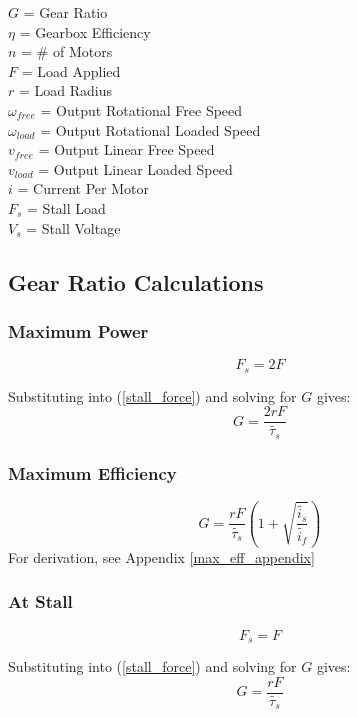 \documentclass[11pt,a4paper,titlepage]{article}
\begin{document}
	$G$ = Gear Ratio \\
	$\eta$ = Gearbox Efficiency \\
	$n$ = \# of Motors \\
	$F$ = Load Applied \\
	$r$ = Load Radius \\
	$\omega_{free}$ = Output Rotational Free Speed \\
	$\omega_{load}$ = Output Rotational Loaded Speed \\
	$v_{free}$ = Output Linear Free Speed \\
	$v_{load}$ = Output Linear Loaded Speed \\
	$i$ = Current Per Motor \\
	$F_s$ = Stall Load \\
	$V_s$ = Stall Voltage
	
	\subsection{Gear Ratio Calculations}
	\subsubsection{Maximum Power}
	\begin{equation}
		F_s = 2 F
	\end{equation}
	
	Substituting into (\ref{stall_force}) and solving for $G$ gives:
	\begin{equation}
		G = \frac{2 r F}{\tilde{\tau_s}}
	\end{equation}
	
	\subsubsection{Maximum Efficiency}
	\begin{equation} \label{max_eff}
		G = \frac{r F}{\tilde{\tau_s}} \left( 1 + \sqrt{\frac{\tilde{i_s}}{\tilde{i_f}}} \right)
	\end{equation}
	For derivation, see Appendix \ref{max_eff_appendix}
	
	\newpage
	\subsubsection{At Stall}
	\begin{equation}
		F_s = F
	\end{equation}
	
	Substituting into (\ref{stall_force}) and solving for $G$ gives:
	\begin{equation}
	G = \frac{r F}{\tilde{\tau_s}}
	\end{equation}
	
\end{document}
